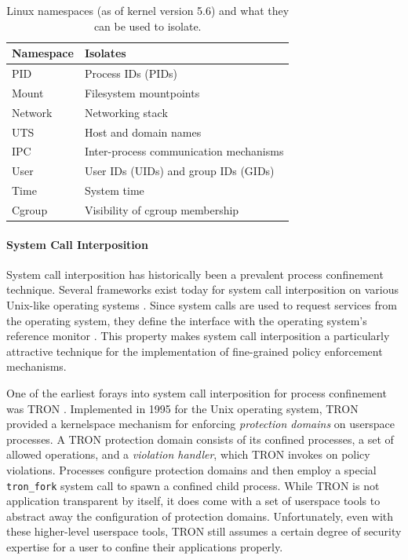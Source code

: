 \begin{table}
\begin{tabular}{lp{3in}}
    \toprule
    Namespace & Isolates \\
    \midrule
    \multirow{1}{*}{PID} & Process IDs (PIDs)\\
    \multirow{1}{*}{Mount} & Filesystem mountpoints\\
    \multirow{1}{*}{Network} & Networking stack\\
    \multirow{1}{*}{UTS} & Host and domain names\\
    \multirow{1}{*}{IPC} & Inter-process communication mechanisms\\
    \multirow{1}{*}{User} & User IDs (UIDs) and group IDs (GIDs)\\
    \multirow{1}{*}{Time} & System time\\
    \multirow{1}{*}{Cgroup} & Visibility of cgroup membership\\
    \bottomrule
\end{tabular}
\caption{Linux namespaces (as of kernel version 5.6) and what they can be used to isolate.}
\label{tab:namespaces}
\end{table}

\paragraph*{System Call Interposition}

System call interposition has historically been a prevalent process confinement technique. Several frameworks exist today for system call interposition on various Unix-like operating systems \cite{anderson2017_comparison, padala2002_ptrace, watson2010_capsicum, pledge}.  Since system calls are used to request services from the operating system, they define the interface with the operating system's reference monitor  \cite{anderson1973_planning_study}. This property makes system call interposition a particularly attractive technique for the implementation of fine-grained policy enforcement mechanisms.

One of the earliest forays into system call interposition for process confinement was TRON \cite{berman1995_tron}. Implemented in 1995 for the Unix operating system, TRON provided a kernelspace mechanism for enforcing \textit{protection domains} on userspace processes. A TRON protection domain consists of its confined processes, a set of allowed operations, and a \textit{violation handler}, which TRON invokes on policy violations. Processes configure protection domains and then employ a special \texttt{tron\_fork} system call to spawn a confined child process. While TRON is not application transparent by itself, it does come with a set of userspace tools to abstract away the configuration of protection domains. Unfortunately, even with these higher-level userspace tools, TRON still assumes a certain degree of security expertise for a user to confine their applications properly.

